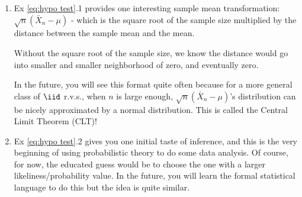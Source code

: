 \begin{remark}
	\begin{enumerate}
		\item Ex \ref{eq:hypo test}.1 provides one interesting sample mean transformation: $\sqrt{n}(\bar{X}_n-\mu)$ - which is the square root of the sample size multiplied by the distance between the sample mean and the mean. 
		
		Without  the square root of the sample size, we know the distance would go into smaller and smaller neighborhood of zero, and eventually zero.
		
		In the future, you will see this format quite often because for a more general class of $\iid$ r.v.s., when $n$ is large enough,  $\sqrt{n}(\bar{X}_n-\mu)$'s distribution can be nicely approximated by a normal distribution. This is called the Central Limit Theorem (CLT)! 
		\item Ex \ref{eq:hypo test}.2 gives you one initial taste of inference, and this is the very beginning of using probabilistic theory to do some data analysis. Of course, for now, the educated guess would be to choose the one with a larger likeliness/probability value. In the future, you will learn the formal statistical language to do this but the idea is quite similar. 
	\end{enumerate}
\end{remark}

